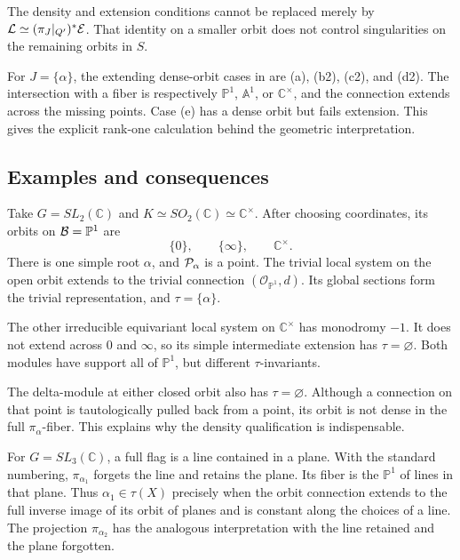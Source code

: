 The density and extension conditions cannot be replaced merely by
$\mathcal{L}\simeq(\pi_J|_{Q'})^*\mathcal E$. That identity on a smaller orbit
does not control singularities on the remaining orbits in $S$.

For $J=\{\alpha\}$, the extending dense-orbit cases in
\cite[Lemma 3.5]{LusztigVogan1983} are (a), (b2), (c2), and (d2). The intersection with
a fiber is respectively $\mathbb P^1$, $\mathbb A^1$, or
$\mathbb C^\times$, and the connection extends across the missing points.
Case (e) has a dense orbit but fails extension. This gives the explicit
rank-one calculation behind the geometric interpretation.

\subsection{Examples and consequences}

\begin{examp}
Take $G=SL_2(\mathbb C)$ and $K\simeq SO_2(\mathbb C)\simeq\mathbb C^\times$.
After choosing coordinates, its orbits on $\mathcal{B}=\mathbb P^1$ are
\[
 \{0\},\qquad\{\infty\},\qquad\mathbb C^\times.
\]
There is one simple root $\alpha$, and $\mathcal{P}_\alpha$ is a point.
The trivial local system on the open orbit extends to the trivial
connection $(\mathcal O_{\mathbb P^1},d)$. Its global sections form the
trivial representation, and $\tau=\{\alpha\}$.

The other irreducible equivariant local system on $\mathbb C^\times$
has monodromy $-1$. It does not extend across $0$ and $\infty$, so its
simple intermediate extension has $\tau=\varnothing$. Both modules have
support all of $\mathbb P^1$, but different $\tau$-invariants.

The delta-module at either closed orbit also has $\tau=\varnothing$.
Although a connection on that point is tautologically pulled back from
a point, its orbit is not dense in the full $\pi_\alpha$-fiber. This
explains why the density qualification is indispensable.
\end{examp}

\begin{examp}
For $G=SL_3(\mathbb C)$, a full flag is a line contained in a plane.
With the standard numbering, $\pi_{\alpha_1}$ forgets the line and
retains the plane. Its fiber is the $\mathbb P^1$ of lines in that plane.
Thus $\alpha_1\in\tau(X)$ precisely when the orbit connection extends
to the full inverse image of its orbit of planes and is constant along
the choices of a line. The projection $\pi_{\alpha_2}$ has the analogous
interpretation with the line retained and the plane forgotten.
\end{examp}

